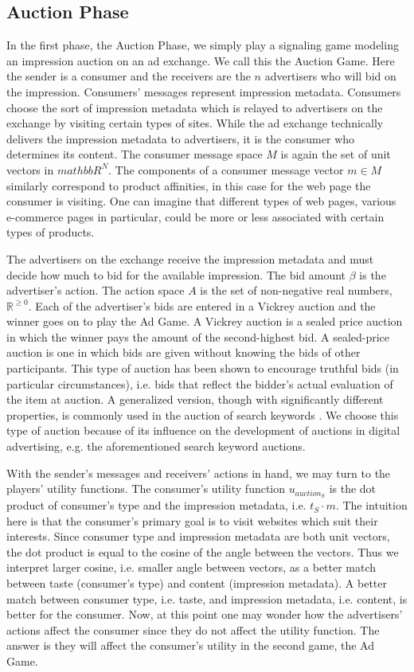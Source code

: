 \documentclass{article}
\begin{document}
\subsection{Auction Phase}

In the first phase, the Auction Phase, we simply play a signaling game modeling an impression auction on an ad exchange. We call this the Auction Game. Here the sender is a consumer and the receivers are the $n$ advertisers who will bid on the impression. Consumers' messages represent impression metadata. Consumers choose the sort of impression metadata which is relayed to advertisers on the exchange by visiting certain types of sites. While the ad exchange technically delivers the impression metadata to advertisers, it is the consumer who determines its content. The consumer message space $M$ is again the set of unit vectors in $mathbb{R}^N$. The components of a consumer message vector $m \in M$ similarly correspond to product affinities, in this case for the web page the consumer is visiting. One can imagine that different types of web pages, various e-commerce pages in particular, could be more or less associated with certain types of products.

The advertisers on the exchange receive the impression metadata and must decide how much to bid for the available impression. The bid amount $\beta$ is the advertiser's action. The action space $A$ is the set of non-negative real numbers, $\mathbb{R}^{\ge 0}$. Each of the advertiser's bids are entered in a Vickrey auction \cite{vickrey_auctions} and the winner goes on to play the Ad Game. A Vickrey auction is a sealed price auction in which the winner pays the amount of the second-highest bid. A sealed-price auction is one in which bids are given without knowing the bids of other participants. This type of auction has been shown to encourage truthful bids (in particular circumstances), i.e. bids that reflect the bidder's actual evaluation of the item at auction. A generalized version, though with significantly different properties, is commonly used in the auction of search keywords \cite{edelman_gsp}. We choose this type of auction because of its influence on the development of auctions in digital advertising, e.g. the aforementioned search keyword auctions.

With the sender's messages and receivers' actions in hand, we may turn to the players' utility functions. The consumer's utility function $u_{auction_S}$ is the dot product of consumer's type and the impression metadata, i.e. $t_S \cdot m$. The intuition here is that the consumer's primary goal is to visit websites which suit their interests. Since consumer type and impression metadata are both unit vectors, the dot product is equal to the cosine of the angle between the vectors. Thus we interpret larger cosine, i.e. smaller angle between vectors, as a better match between taste (consumer's type) and content (impression metadata). A better match between consumer type, i.e. taste, and impression metadata, i.e. content, is better for the consumer. Now, at this point one may wonder how the advertisers' actions affect the consumer since they do not affect the utility function. The answer is they will affect the consumer's utility in the second game, the Ad Game.
\end{document}

